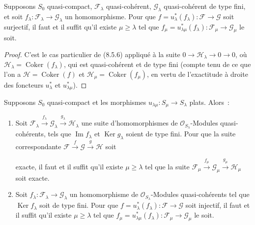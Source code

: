 \begin{corollary}[8.5.7]
\label{IV.8.5.7-fr}
Supposons $S_0$ quasi-compact, $\mathcal F_\lambda$ quasi-cohérent,
$\mathcal G_\lambda$ quasi-cohérent de type fini, et soit
$f_\lambda:\mathcal F_\lambda\to\mathcal G_\lambda$ un homomorphisme. Pour que
$f=u_\lambda^*(f_\lambda):\mathcal F\to\mathcal G$ soit surjectif, il faut et
il suffit qu'il existe $\mu\geq\lambda$ tel que
$f_\mu=u_{\lambda\mu}^*(f_\lambda):\mathcal F_\mu\to\mathcal G_\mu$ le soit.
\end{corollary}

\begin{proof}
C'est le cas particulier de (8.5.6) appliqué à la suite
$0\to\mathcal H_\lambda\to0\to0$, où
$\mathcal H_\lambda=\operatorname{Coker}(f_\lambda)$, qui est quasi-cohérent et
de type fini (compte tenu de ce que l'on a
$\mathcal H=\operatorname{Coker}(f)$ et
$\mathcal H_\mu=\operatorname{Coker}(f_\mu)$, en vertu de l'exactitude à droite
des foncteurs $u_\lambda^*$ et $u_{\lambda\mu}^*$).
\end{proof}

\begin{corollary}[8.5.8]
\label{IV.8.5.8-fr}
Supposons $S_0$ quasi-compact et les morphismes
$u_{\lambda\mu}:S_\mu\to S_\lambda$ plats. Alors~:
\begin{enumerate}[label=(\roman*)]
  \item Soit
  $\mathcal F_\lambda\xrightarrow{f_\lambda}\mathcal G_\lambda
  \xrightarrow{g_\lambda}\mathcal H_\lambda$ une suite d'homomorphismes de
  $\mathcal O_{S_\lambda}$-Modules quasi-cohérents, tels que
  $\operatorname{Im}f_\lambda$ et $\operatorname{Ker}g_\lambda$ soient de type
  fini. Pour que la suite correspondante
  $\mathcal F\xrightarrow{f}\mathcal G\xrightarrow{g}\mathcal H$ soit

  exacte, il faut et il suffit qu'il existe $\mu\geq\lambda$ tel que la suite
  $\mathcal F_\mu\xrightarrow{f_\mu}\mathcal G_\mu
  \xrightarrow{g_\mu}\mathcal H_\mu$ soit exacte.

  \item Soit $f_\lambda:\mathcal F_\lambda\to\mathcal G_\lambda$ un
  homomorphisme de $\mathcal O_{S_\lambda}$-Modules quasi-cohérents tel que
  $\operatorname{Ker}f_\lambda$ soit de type fini. Pour que
  $f=u_\lambda^*(f_\lambda):\mathcal F\to\mathcal G$ soit injectif, il faut et
  il suffit qu'il existe $\mu\geq\lambda$ tel que
  $f_\mu=u_{\lambda\mu}^*(f_\lambda):\mathcal F_\mu\to\mathcal G_\mu$ le soit.
\end{enumerate}
\end{corollary}

